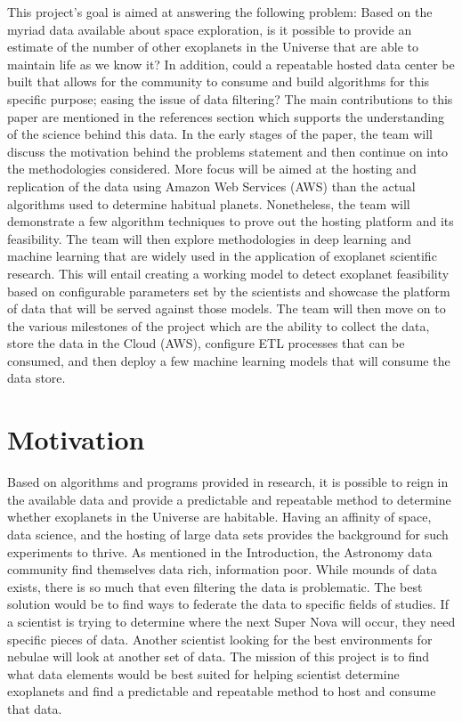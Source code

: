 \documentclass[letterpaper, 10 pt, conference]{ieeeconf}  %
\begin{document}
This project's goal is aimed at answering the following problem: Based on the myriad data available about space exploration, is it possible to provide an estimate of the number of other exoplanets in the Universe that are able to maintain life as we know it? In addition, could a repeatable hosted data center be built that allows for the community to consume and build algorithms for this specific purpose; easing the issue of data filtering? The main contributions to this paper are mentioned  in the references section which supports the understanding of the science behind this data. In the early stages of the paper, the team will discuss the motivation behind the problems statement and then continue on into the methodologies considered. More focus will be aimed at the hosting and replication of the data using Amazon Web Services (AWS) than the actual algorithms used to determine habitual planets. Nonetheless, the team will demonstrate a few algorithm techniques to prove out the hosting platform and its feasibility. The team will then explore methodologies in deep learning and machine learning that are widely used in the application of exoplanet scientific research. This will entail creating a working model to detect exoplanet feasibility based on configurable parameters set by the scientists and showcase the platform of data that will be served against those models. The team will then move on to the various milestones of the project which are the ability to collect the data, store the data in the Cloud (AWS), configure ETL processes that can be consumed, and then deploy a few machine learning models that will consume the data store.

\section{Motivation}

Based on algorithms and programs provided in research, it is possible to reign in the available data and provide a predictable and repeatable method to determine whether exoplanets in the Universe are habitable. Having an affinity of space, data science, and the hosting of large data sets provides the background for such experiments to thrive. As mentioned in the Introduction, the Astronomy data community find themselves data rich, information poor. While mounds of data exists, there is so much that even filtering the data is problematic. The best solution would be to find ways to federate the data to specific fields of studies. If a scientist is trying to determine where the next Super Nova will occur, they need specific pieces of data. Another scientist looking for the best environments for nebulae will look at another set of data. The mission of this project is to find what data elements would be best suited for helping scientist determine exoplanets and find a predictable and repeatable method to host and consume that data. 
\end{document}

